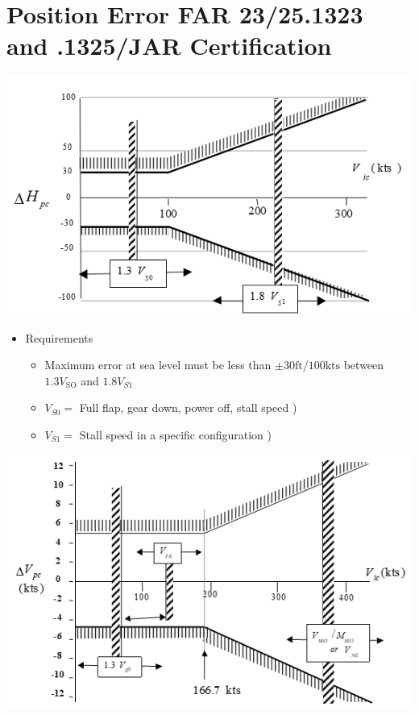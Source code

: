 \documentclass[
]{book}
\providecommand{\tightlist}{%
  \setlength{\itemsep}{0pt}\setlength{\parskip}{0pt}}
\begin{document}
\hypertarget{position-error-far-2325.1323-and-.1325jar-certification}{%
\section{Position Error FAR 23/25.1323 and .1325/JAR Certification}\label{position-error-far-2325.1323-and-.1325jar-certification}}

\includegraphics{media/04/image47.png}

\begin{itemize}
\tightlist
\item
  Requirements

  \begin{itemize}
  \tightlist
  \item
    Maximum error at sea level must be less than \(\pm 30 \text{ft}/100 \text{kts}\) between \(1.3 V_{\mathrm{SO}}\) and \(1.8 V_{S1}\)
  \item
    \(V_{S0} =\) Full flap, gear down, power off, stall speed )
  \item
    \(V_{S1} =\) Stall speed in a specific configuration )
  \end{itemize}
\end{itemize}

\includegraphics{media/04/image48.png}
\end{document}
